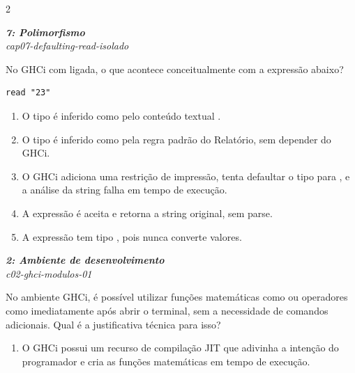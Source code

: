 \documentclass[a4paper,10pt,brazil]{article}
\begin{document}
\begin{multicols}{2}
\begin{flushright}
  \footnotesize
  \textit{\textbf{7: Polimorfismo}}\\
  \textit{cap07-defaulting-read-isolado}\\

\end{flushright}
No GHCi com  ligada, o que acontece conceitualmente com a expressão abaixo?

\begin{verbatim}
read "23"
\end{verbatim}

\begin{enumerate}
  \item O tipo é inferido como  pelo conteúdo textual .
  \item O tipo é inferido como  pela regra padrão do Relatório, sem depender do GHCi.
  \item O GHCi adiciona uma restrição de impressão, tenta defaultar o tipo para \haskellinline{()}, e a análise da string  falha em tempo de execução.
  \item A expressão é aceita e retorna a string original, sem parse.
  \item A expressão tem tipo , pois  nunca converte valores.

\end{enumerate}

\begin{flushright}
  \footnotesize
  \textit{\textbf{2: Ambiente de desenvolvimento}}\\
  \textit{c02-ghci-modulos-01}\\

\end{flushright}
No ambiente GHCi, é possível utilizar funções matemáticas como  ou operadores como \haskellinline{+} imediatamente após abrir o terminal, sem a necessidade de comandos adicionais. Qual é a justificativa técnica para isso?

\begin{enumerate}
  \item O GHCi possui um recurso de compilação JIT que adivinha a intenção do programador e cria as funções matemáticas em tempo de execução.


\end{enumerate}
\end{multicols}
\end{document}
